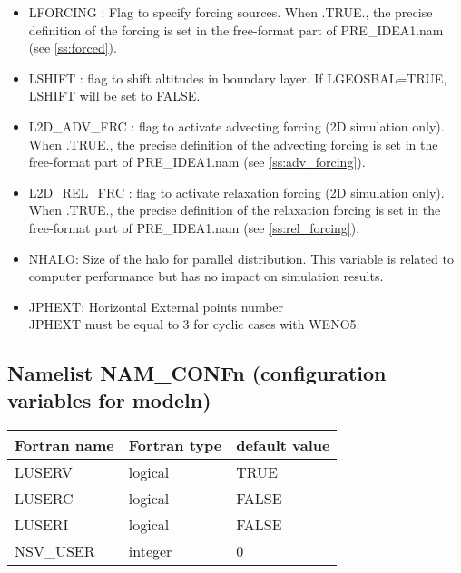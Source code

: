 \begin{itemize}
\item LFORCING  : Flag to 
specify forcing sources.
When .TRUE., the precise definition of the forcing is set in the free-format 
part of PRE\_IDEA1.nam (see \ref{ss:forced}).

\item LSHIFT  : flag to shift altitudes in boundary layer. If LGEOSBAL=TRUE, LSHIFT will be set to FALSE.

\item L2D\_ADV\_FRC  : flag to activate advecting forcing (2D simulation only). When .TRUE., the precise definition of the advecting forcing is set in the free-format 
part of PRE\_IDEA1.nam (see \ref{ss:adv_forcing}).

\item L2D\_REL\_FRC  : flag to activate relaxation forcing (2D simulation only). When .TRUE., the precise definition of the relaxation forcing is set in the free-format 
part of PRE\_IDEA1.nam (see \ref{ss:rel_forcing}).

 \item
NHALO: Size of the halo for parallel distribution.
This variable is related to computer performance but has no
impact on simulation results.\\

\item
JPHEXT:  Horizontal External points number\\
JPHEXT must be equal to 3 for cyclic cases with WENO5.

\end{itemize}


\subsection{Namelist NAM\_CONFn (configuration variables for
modeln)}

\begin{center}
\begin{tabular} {|l|l|l|}
\hline
Fortran name & Fortran type & default value \\
\hline
LUSERV    & logical & TRUE  \\
LUSERC    & logical & FALSE  \\
LUSERI    & logical & FALSE  \\
NSV\_USER  & integer & 0   \\  
\hline
\end{tabular}
\end{center}

